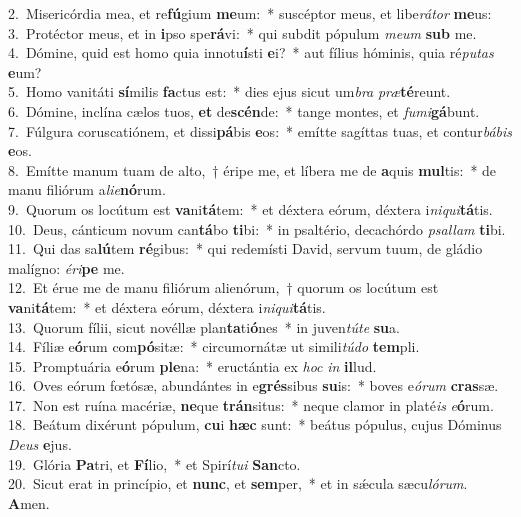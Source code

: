 {2.~}Misericórdia mea, et re\textbf{fú}gium \textbf{me}um:~* suscéptor meus, et libe\textit{rá}\textit{tor} \textbf{me}us:\\
{3.~}Protéctor meus, et in \textbf{i}pso spe\textbf{rá}vi:~* qui subdit pópulum \textit{me}\textit{um} \textbf{sub} me.\\
{4.~}Dómine, quid est homo quia innotu\textbf{í}sti \textbf{e}i?~* aut fílius hóminis, quia ré\textit{pu}\textit{tas} \textbf{e}um?\\
{5.~}Homo vanitáti \textbf{sí}milis \textbf{fa}ctus est:~* dies ejus sicut um\textit{bra} \textit{præ}\textbf{té}reunt.\\
{6.~}Dómine, inclína cælos tuos, \textbf{et} de\textbf{scén}de:~* tange montes, et \textit{fu}\textit{mi}\textbf{gá}bunt.\\
{7.~}Fúlgura coruscatiónem, et dissi\textbf{pá}bis \textbf{e}os:~* emítte sagíttas tuas, et contur\textit{bá}\textit{bis} \textbf{e}os.\\
{8.~}Emítte manum tuam de alto,~† éripe me, et líbera me de \textbf{a}quis \textbf{mul}tis:~* de manu filiórum a\textit{li}\textit{e}\textbf{nó}rum.\\
{9.~}Quorum os locútum est \textbf{va}ni\textbf{tá}tem:~* et déxtera eórum, déxtera i\textit{ni}\textit{qui}\textbf{tá}tis.\\
{10.~}Deus, cánticum novum can\textbf{tá}bo \textbf{ti}bi:~* in psaltério, decachórdo \textit{psal}\textit{lam} \textbf{ti}bi.\\
{11.~}Qui das sa\textbf{lú}tem \textbf{ré}gibus:~* qui redemísti David, servum tuum, de gládio malígno: \textit{é}\textit{ri}\textbf{pe} me.\\
{12.~}Et érue me de manu filiórum alienórum,~† quorum os locútum est \textbf{va}ni\textbf{tá}tem:~* et déxtera eórum, déxtera i\textit{ni}\textit{qui}\textbf{tá}tis.\\
{13.~}Quorum fílii, sicut novéllæ plan\textbf{ta}ti\textbf{ó}nes~* in juven\textit{tú}\textit{te} \textbf{su}a.\\
{14.~}Fíliæ e\textbf{ó}rum com\textbf{pó}sitæ:~* circumornátæ ut simili\textit{tú}\textit{do} \textbf{tem}pli.\\
{15.~}Promptuária e\textbf{ó}rum \textbf{ple}na:~* eructántia ex \textit{hoc} \textit{in} \textbf{il}lud.\\
{16.~}Oves eórum fœtósæ, abundántes in e\textbf{grés}sibus \textbf{su}is:~* boves e\textit{ó}\textit{rum} \textbf{cras}sæ.\\
{17.~}Non est ruína macériæ, \textbf{ne}que \textbf{trán}situs:~* neque clamor in platé\textit{is} \textit{e}\textbf{ó}rum.\\
{18.~}Beátum dixérunt pópulum, \textbf{cu}i \textbf{hæc} sunt:~* beátus pópulus, cujus Dóminus \textit{De}\textit{us} \textbf{e}jus.\\
{19.~}Glória \textbf{Pa}tri, et \textbf{Fí}lio,~* et Spirí\textit{tu}\textit{i} \textbf{San}cto.\\
{20.~}Sicut erat in princípio, et \textbf{nunc}, et \textbf{sem}per,~* et in sǽcula sæcu\textit{ló}\textit{rum}. \textbf{A}men.\\
